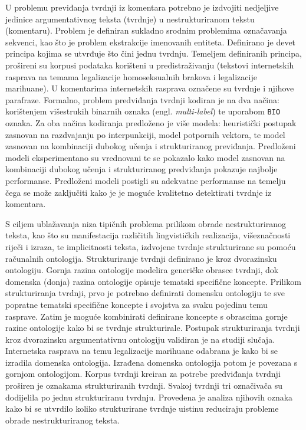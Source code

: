 U problemu previđanja tvrdnji iz komentara potrebno je izdvojiti nedjeljive jedinice
argumentativnog teksta (tvrdnje) u nestrukturiranom tekstu (komentaru).
Problem je definiran sukladno srodnim
problemima označavanja sekvenci, kao što je problem ekstrakcije imenovanih
entiteta. 
Definirano je devet principa kojima se utvrđuje što čini jednu tvrdnju. 
Temeljem definiranih principa, prošireni su korpusi podataka korišteni u 
predistraživanju (tekstovi internetskih rasprava na temama 
legalizacije homoseksualnih brakova i legalizacije marihuane). 
U komentarima internetskih rasprava označene su tvrdnje i njihove parafraze.
Formalno, problem predviđanja tvrdnji kodiran je na dva načina: 
korištenjem višestrukih binarnih oznaka (engl. \emph{multi-label}) 
te uporabom \texttt{BIO} oznaka. 
Za oba načina kodiranja
predloženo je više modela: heuristički postupak zasnovan na razdvajanju po 
interpunkciji, model potpornih vektora, te model zasnovan na kombinaciji dubokog
učenja i strukturiranog previđanja. Predloženi modeli eksperimentano su vrednovani 
te se pokazalo kako model zasnovan na kombinaciji dubokog učenja i strukturiranog predviđanja
pokazuje najbolje performanse. Predloženi modeli postigli 
su adekvatne performanse na temelju čega se može zaključiti kako je 
je moguće kvalitetno detektirati tvrdnje iz komentara. 

S ciljem ublažavanja niza tipičnih problema prilikom obrade
nestrukturiranog teksta, kao što su 
manifestacija različitih lingvističkih realizacija,
višeznačnosti riječi i izraza, te
implicitnosti teksta, 
izdvojene tvrdnje strukturirane su pomoću računalnih ontologija. 
Strukturiranje tvrdnji definirano je 
kroz dvorazinsku ontologiju. 
Gornja razina ontologije modelira generičke obrasce tvrdnji, dok 
domenska (donja) razina ontologije opisuje tematski specifične koncepte. 
Prilikom strukturiranja tvrdnji, prvo je potrebno definirati 
domensku ontologiju te sve popratne tematski specifične koncepte i
svojstva za svaku pojedinu temu rasprave. Zatim je moguće kombinirati 
definirane koncepte s obrascima gornje razine ontologije kako bi se tvrdnje strukturirale. 
Postupak strukturiranja tvrdnji kroz dvorazinsku argumentativnu ontologiju
validiran je na studiji slučaja. Internetska rasprava na temu
legalizacije marihuane odabrana je kako bi se izradila domenska ontologija. 
Izrađena domenska ontologija potom je povezana s gornjom ontologijom.
Korpus tvrdnji kreiran za potrebe predviđanja tvrdnji proširen je
oznakama strukturiranih tvrdnji. Svakoj tvrdnji tri označivača su dodijelila 
po jednu strukturiranu tvrdnju. 
Provedena je analiza njihovih oznaka kako bi se utvrdilo koliko
strukturirane tvrdnje uistinu reduciraju probleme obrade
nestrukturiranog teksta. 

